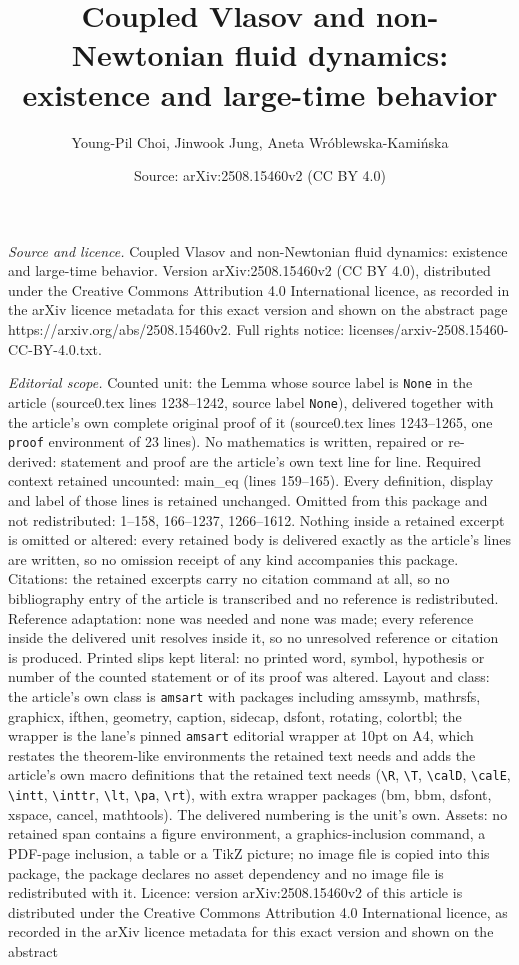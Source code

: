 \documentclass[10pt,a4paper]{amsart}
\title[Coupled Vlasov and non-Newtonian fluid dynamics: existence a]{Coupled Vlasov and non-Newtonian fluid dynamics: existence and large-time behavior}
\author{Young-Pil Choi, Jinwook Jung, Aneta Wr\'oblewska-Kami\'nska}
\date{Source: arXiv:2508.15460v2 (CC BY 4.0)}
\begin{document}
\maketitle

\noindent\emph{Source and licence.} Coupled Vlasov and non-Newtonian fluid dynamics: existence and large-time behavior. Version arXiv:2508.15460v2 (CC BY 4.0), distributed under the Creative Commons Attribution 4.0 International licence, as recorded in the arXiv licence metadata for this exact version and shown on the abstract page https://arxiv.org/abs/2508.15460v2. Full rights notice: licenses/arxiv-2508.15460-CC-BY-4.0.txt.\par\smallskip

\noindent\textit{Editorial scope.} Counted unit: the Lemma whose source label is \texttt{None} in the article (source0.tex lines 1238--1242, source label \texttt{None}), delivered together with the article's own complete original proof of it (source0.tex lines 1243--1265, one \texttt{proof} environment of 23 lines). No mathematics is written, repaired or re-derived: statement and proof are the article's own text line for line. Required context retained uncounted: main\_eq (lines 159--165). Every definition, display and label of those lines is retained unchanged. Omitted from this package and not redistributed: 1--158, 166--1237, 1266--1612. Nothing inside a retained excerpt is omitted or altered: every retained body is delivered exactly as the article's lines are written, so no omission receipt of any kind accompanies this package. Citations: the retained excerpts carry no citation command at all, so no bibliography entry of the article is transcribed and no reference is redistributed. Reference adaptation: none was needed and none was made; every reference inside the delivered unit resolves inside it, so no unresolved reference or citation is produced. Printed slips kept literal: no printed word, symbol, hypothesis or number of the counted statement or of its proof was altered. Layout and class: the article's own class is \texttt{amsart} with packages including amssymb, mathrsfs, graphicx, ifthen, geometry, caption, sidecap, dsfont, rotating, colortbl; the wrapper is the lane's pinned \texttt{amsart} editorial wrapper at 10pt on A4, which restates the theorem-like environments the retained text needs and adds the article's own macro definitions that the retained text needs (\texttt{\textbackslash R}, \texttt{\textbackslash T}, \texttt{\textbackslash calD}, \texttt{\textbackslash calE}, \texttt{\textbackslash intt}, \texttt{\textbackslash inttr}, \texttt{\textbackslash lt}, \texttt{\textbackslash pa}, \texttt{\textbackslash rt}), with extra wrapper packages (bm, bbm, dsfont, xspace, cancel, mathtools). The delivered numbering is the unit's own. Assets: no retained span contains a figure environment, a graphics-inclusion command, a PDF-page inclusion, a table or a TikZ picture; no image file is copied into this package, the package declares no asset dependency and no image file is redistributed with it. Licence: version arXiv:2508.15460v2 of this article is distributed under the Creative Commons Attribution 4.0 International licence, as recorded in the arXiv licence metadata for this exact version and shown on the abstract 
\end{document}
